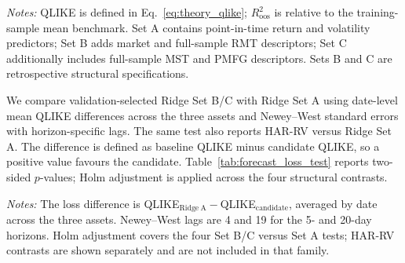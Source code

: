 \noindent\footnotesize\emph{Notes:} QLIKE is defined in Eq.~\eqref{eq:theory_qlike}; $R^2_{\mathrm{oos}}$ is relative to the training-sample mean benchmark. Set A contains point-in-time return and volatility predictors; Set B adds market and full-sample RMT descriptors; Set C additionally includes full-sample MST and PMFG descriptors. Sets B and C are retrospective structural specifications.
\normalsize

We compare validation-selected Ridge Set B/C with Ridge Set A using date-level mean QLIKE differences across the three assets and Newey--West standard errors with horizon-specific lags. The same test also reports HAR-RV versus Ridge Set A. The difference is defined as baseline QLIKE minus candidate QLIKE, so a positive value favours the candidate. Table~\ref{tab:forecast_loss_test} reports two-sided $p$-values; Holm adjustment is applied across the four structural contrasts.

\begin{center}
\label{tab:forecast_loss_test}
\end{center}

\noindent\footnotesize\emph{Notes:} The loss difference is QLIKE$_{\mathrm{Ridge\ A}}-$QLIKE$_{\mathrm{candidate}}$, averaged by date across the three assets. Newey--West lags are 4 and 19 for the 5- and 20-day horizons. Holm adjustment covers the four Set B/C versus Set A tests; HAR-RV contrasts are shown separately and are not included in that family.
\normalsize

